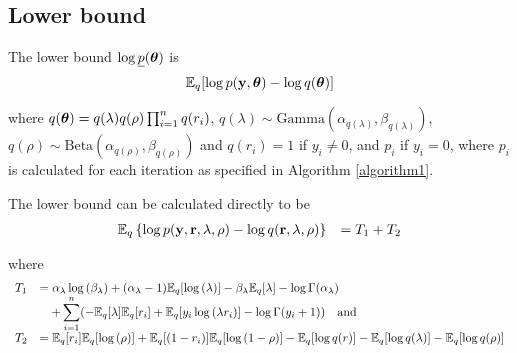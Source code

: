 \documentclass[11pt]{amsart}
\begin{document}

\subsection{Lower bound}
The lower bound $\log{\underline{p}({\boldsymbol\theta})}$ is
$$
{\mathbb E}_q[\log{p({\bf y}, {\boldsymbol\theta})} - \log{q({\boldsymbol\theta})}]
$$

\noindent where $q({\boldsymbol \theta}) = q(\lambda) q(\rho) \prod_{i=1}^n q(r_i)$,
$q(\lambda) \sim \text{Gamma}{(\alpha_{q(\lambda)}, \beta_{q(\lambda)})}$,
$q(\rho) \sim \text{Beta}(\alpha_{q(\rho)}, \beta_{q(\rho)})$ and
$q(r_i) = 1$ if $y_i \ne 0$, and $p_i$ if $y_i = 0$, where $p_i$ is
calculated for each iteration as specified in Algorithm \ref{algorithm1}.

The lower bound can be calculated directly to be
$$
\begin{array}{rl}
	{\mathbb E}_q \left\{ \log{p({\bf y}, {\bf r}, \lambda, \rho)} - \log{q({\bf r}, \lambda, \rho)} \right\} & = T_1 + T_2 \\
\end{array}
$$

\noindent where
$$
\begin{array}{rl}
	T_1 & \displaystyle =                                                                                                                          
	\alpha_\lambda \log{(\beta_\lambda)} + (\alpha_\lambda - 1) {\mathbb E}_q[\log{(\lambda)}] - \beta_\lambda {\mathbb E}_q [\lambda] - \log\Gamma(\alpha_\lambda) \\
	    & \displaystyle \quad + \sum_{i=1}^n ( -{\mathbb E}_q [\lambda] {\mathbb E}_q [r_i] + {\mathbb E}_q[y_i \log{(\lambda r_i)}] - \log\Gamma(y_i+1)) \quad \mbox{and} 
	\\ [1ex]
	T_2 & ={\mathbb E}_q[r_i] {\mathbb E}_q[\log{(\rho)}] + {\mathbb E}_q[(1 - r_i)] {\mathbb E}_q[\log{(1 - \rho)}]                                                     
	- {\mathbb E}_q[\log{q(r)}] 
	- {\mathbb E}_q[\log{q(\lambda)}] 
	- {\mathbb E}_q[ \log{q(\rho)}]
\end{array}
$$
\end{document}
